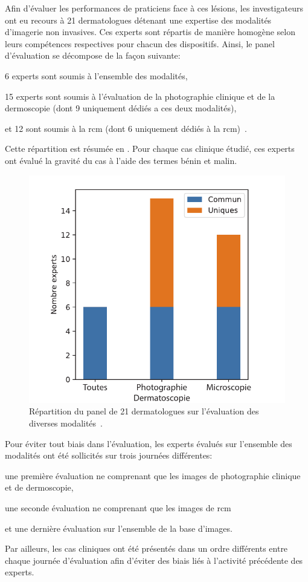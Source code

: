 Afin d'évaluer les performances de praticiens face à ces lésions, les investigateurs ont eu recours à 21 dermatologues détenant une expertise des modalités d'imagerie non invasives. Ces experts sont répartis de manière homogène selon leurs compétences respectives pour chacun des dispositifs. Ainsi, le panel d'évaluation se décompose de la façon suivante: 
\begin{inlinerate}
\item 6 experts sont soumis à l'ensemble des modalités,
\item 15 experts sont soumis à l'évaluation de la photographie clinique et de la dermoscopie (dont 9 uniquement dédiés a ces deux modalités),
\item et 12 sont soumis à la \gls{rcm} (dont 6 uniquement dédiés à la \gls{rcm})~\cite{Cinotti2018}.
\end{inlinerate}
Cette répartition est résumée en . Pour chaque cas clinique étudié, ces experts ont évalué la gravité du cas à l'aide des termes bénin et malin.\par

\begin{figure}[H]
    \centering
    \includegraphics[width=0.6\linewidth]{contents/chapter_2/resources/experts_evaluation.pdf}
    \caption{Répartition du panel de 21 dermatologues sur l'évaluation des diverses modalités~\cite{Cinotti2018}.}
    \label{fig:experts_evaluation}
\end{figure}\par

Pour éviter tout biais dans l'évaluation, les experts évalués sur l'ensemble des modalités ont été sollicités sur trois journées différentes: 
\begin{inlinerate}
\item une première évaluation ne comprenant que les images de photographie clinique et de dermoscopie,
\item une seconde évaluation ne comprenant que les images de \gls{rcm}
\item et une dernière évaluation sur l'ensemble de la base d'images.
\end{inlinerate}
Par ailleurs, les cas cliniques ont été présentés dans un ordre différents entre chaque journée d'évaluation afin d'éviter des biais liés à l'activité précédente des experts.\par

